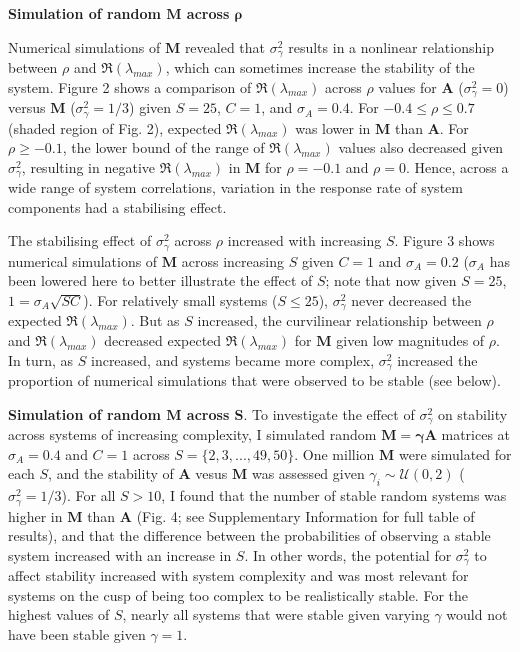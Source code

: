 \documentclass[]{article}
\begin{document}
\textbf{Simulation of random \(\mathbf{M}\) across \(\mathbf{\rho}\)}

Numerical simulations of \(\mathbf{M}\) revealed that
\(\sigma^{2}_{\gamma}\) results in a nonlinear relationship between
\(\rho\) and \(\Re(\lambda_{max})\), which can sometimes increase the
stability of the system. Figure 2 shows a comparison of
\(\Re(\lambda_{max})\) across \(\rho\) values for \(\mathbf{A}\)
(\(\sigma^{2}_{\gamma} = 0\)) versus \(\mathbf{M}\)
(\(\sigma^{2}_{\gamma} = 1/3\)) given \(S = 25\), \(C = 1\), and
\(\sigma_{A} = 0.4\). For \(-0.4 \leq \rho \leq 0.7\) (shaded region of
Fig. 2), expected \(\Re(\lambda_{max})\) was lower in \(\mathbf{M}\)
than \(\mathbf{A}\). For \(\rho \geq -0.1\), the lower bound of the
range of \(\Re(\lambda_{max})\) values also decreased given
\(\sigma^{2}_{\gamma}\), resulting in negative \(\Re(\lambda_{max})\) in
\(\mathbf{M}\) for \(\rho = -0.1\) and \(\rho = 0\). Hence, across a
wide range of system correlations, variation in the response rate of
system components had a stabilising effect.

The stabilising effect of \(\sigma^{2}_{\gamma}\) across \(\rho\)
increased with increasing \(S\). Figure 3 shows numerical simulations of
\(\mathbf{M}\) across increasing \(S\) given \(C = 1\) and
\(\sigma_{A} = 0.2\) (\(\sigma_{A}\) has been lowered here to better
illustrate the effect of \(S\); note that now given \(S = 25\),
\(1 = \sigma_{A}\sqrt{SC}\)). For relatively small systems
(\(S \leq 25\)), \(\sigma^{2}_{\gamma}\) never decreased the expected
\(\Re(\lambda_{max})\). But as \(S\) increased, the curvilinear
relationship between \(\rho\) and \(\Re(\lambda_{max})\) decreased
expected \(\Re(\lambda_{max})\) for \(\mathbf{M}\) given low magnitudes
of \(\rho\). In turn, as \(S\) increased, and systems became more
complex, \(\sigma^{2}_{\gamma}\) increased the proportion of numerical
simulations that were observed to be stable (see below).

\textbf{Simulation of random \(\mathbf{M}\) across \(\mathbf{S}\)}. To
investigate the effect of \(\sigma^{2}_{\gamma}\) on stability across
systems of increasing complexity, I simulated random
\(\mathbf{M = \gamma A}\) matrices at \(\sigma_{A} = 0.4\) and \(C = 1\)
across \(S = \{2, 3, ..., 49, 50\}\). One million \(\mathbf{M}\) were
simulated for each \(S\), and the stability of \(\mathbf{A}\) vesus
\(\mathbf{M}\) was assessed given \(\gamma_{i} \sim \mathcal{U}(0, 2)\)
(\(\sigma^{2}_{\gamma} = 1/3\)). For all \(S > 10\), I found that the
number of stable random systems was higher in \(\mathbf{M}\) than
\(\mathbf{A}\) (Fig. 4; see Supplementary Information for full table of
results), and that the difference between the probabilities of observing
a stable system increased with an increase in \(S\). In other words, the
potential for \(\sigma^{2}_{\gamma}\) to affect stability increased with
system complexity and was most relevant for systems on the cusp of being
too complex to be realistically stable. For the highest values of \(S\),
nearly all systems that were stable given varying \(\gamma\) would not
have been stable given \(\gamma = 1\).
\end{document}
